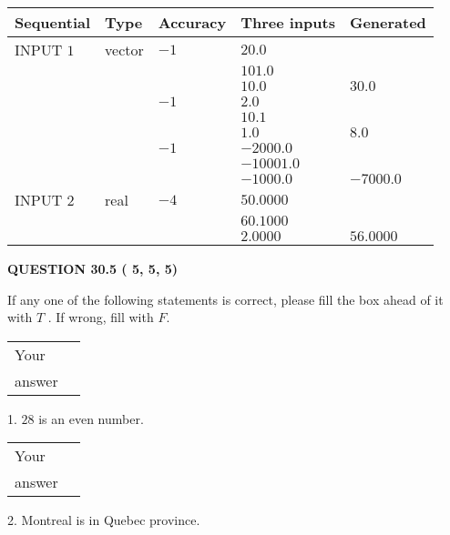 \documentclass[12pt]{article}
\begin{document}
   
  
  
\noindent\begin{tabular}{|l|l|l|l|l|}
\hline
 Sequential & Type & Accuracy & Three inputs & Generated \\ 
\hline
 
 
  INPUT $           1$ & vector & $          -1 $ & $
20.0
  $ & \\
  & & & $
101.0
  $ & \\
  & & & $
10.0
$ & $ 30.0 $ 
  \\
  & & $          -1 $ & $
2.0
  $ & \\
  & & & $
10.1
  $ & \\
  & & & $
1.0
$ & $ 8.0 $ 
  \\
  & & $          -1 $ & $
-2000.0
  $ & \\
  & & & $
-10001.0
  $ & \\
  & & & $
-1000.0
$ & $ -7000.0 $ 
 \\  \hline  
 
 
  INPUT $           2$ & real & $          -4 $ & $
 50.0000
  $ & \\
  & & &  $
 60.1000
  $ & \\
  & & &  $
 2.0000
 $ & $ 56.0000 $ 
 \\  \hline  
 \end{tabular}
   
   
  
\vspace{0.2in}
  
{\textbf{\Large{QUESTION
30.5 
 (          5,          5,          5)
}}}
  
  
If any one of the following statements is correct, please fill the box ahead of it with $T$ .
If wrong, fill with $F$.
 
\noindent\begin{tabular}{|l|l|}\hline Your&\hspace{.2in} \\ answer&\hspace{.2in} \\ \hline \end{tabular}
1. $ %
28$ is an  %
even number.
 
\noindent\begin{tabular}{|l|l|}\hline Your&\hspace{.2in} \\ answer&\hspace{.2in} \\ \hline \end{tabular}
2.  %
Montreal is in  %
Quebec province.
 
\end{document}
